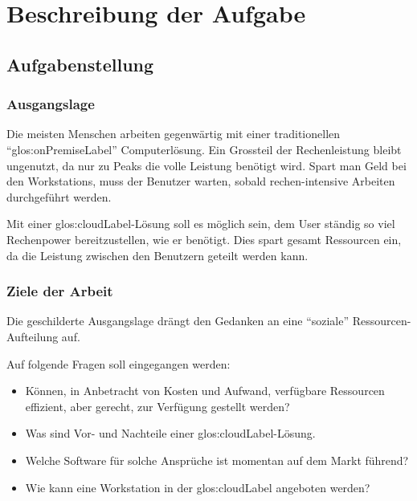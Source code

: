 \chapter{Beschreibung der Aufgabe}

\section{Aufgabenstellung}


\subsection{Ausgangslage}
Die meisten Menschen arbeiten gegenwärtig mit einer traditionellen "`\gls{glos:onPremiseLabel}"' Computerlösung.
Ein Grossteil der Rechenleistung bleibt ungenutzt, da nur zu Peaks die volle Leistung benötigt wird.
Spart man Geld bei den Workstations, muss der Benutzer warten, sobald rechen-intensive Arbeiten durchgeführt werden.

Mit einer \Gls{glos:cloudLabel}-Lösung soll es möglich sein, dem User ständig so viel Rechenpower bereitzustellen, wie er benötigt.
Dies spart gesamt Ressourcen ein, da die Leistung zwischen den Benutzern geteilt werden kann.

\subsection{Ziele der Arbeit}
\label{sec:desc:targets}
Die geschilderte Ausgangslage drängt den Gedanken an eine “soziale” Ressourcen-Aufteilung auf.

Auf folgende Fragen soll eingegangen werden:
\begin{itemize}
	\item Können, in Anbetracht von Kosten und Aufwand, verfügbare Ressourcen effizient, aber gerecht, zur Verfügung gestellt werden?
	\item Was sind Vor- und Nachteile einer \Gls{glos:cloudLabel}-Lösung.
	\item Welche Software für solche Ansprüche ist momentan auf dem Markt führend?
	\item Wie kann eine Workstation in der \Gls{glos:cloudLabel} angeboten werden?
\end{itemize}


